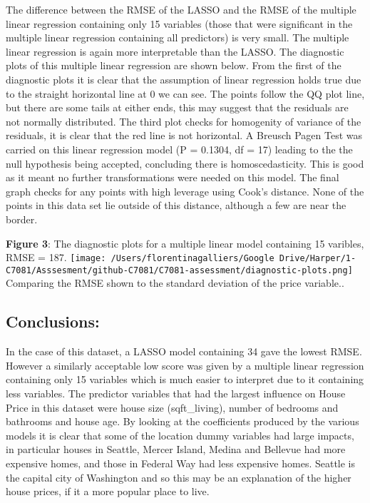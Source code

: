 \documentclass[
]{article}
\begin{document}
The difference between the RMSE of the LASSO and the RMSE of the
multiple linear regression containing only 15 variables (those that were
significant in the multiple linear regression containing all predictors)
is very small. The multiple linear regression is again more
interpretable than the LASSO. The diagnostic plots of this multiple
linear regression are shown below. From the first of the diagnostic
plots it is clear that the assumption of linear regression holds true
due to the straight horizontal line at 0 we can see. The points follow
the QQ plot line, but there are some tails at either ends, this may
suggest that the residuals are not normally distributed. The third plot
checks for homogenity of variance of the residuals, it is clear that the
red line is not horizontal. A Breusch Pagen Test was carried on this
linear regression model (P = 0.1304, df = 17) leading to the the null
hypothesis being accepted, concluding there is homoscedasticity. This is
good as it meant no further transformations were needed on this model.
The final graph checks for any points with high leverage using Cook's
distance. None of the points in this data set lie outside of this
distance, although a few are near the border.

\textbf{Figure 3}: The diagnostic plots for a multiple linear model
containing 15 varibles, RMSE = 187.
\texttt{[image: /Users/florentinagalliers/Google Drive/Harper/1-C7081/Asssesment/github-C7081/C7081-assessment/diagnostic-plots.png]}
Comparing the RMSE shown to the standard deviation of the price
variable..

\hypertarget{conclusions}{%
\subsection{Conclusions:}\label{conclusions}}

In the case of this dataset, a LASSO model containing 34 gave the lowest
RMSE. However a similarly acceptable low score was given by a multiple
linear regression containing only 15 variables which is much easier to
interpret due to it containing less variables. The predictor variables
that had the largest influence on House Price in this dataset were house
size (sqft\_living), number of bedrooms and bathrooms and house age. By
looking at the coefficients produced by the various models it is clear
that some of the location dummy variables had large impacts, in
particular houses in Seattle, Mercer Island, Medina and Bellevue had
more expensive homes, and those in Federal Way had less expensive homes.
Seattle is the capital city of Washington and so this may be an
explanation of the higher house prices, if it a more popular place to
live.
\end{document}
